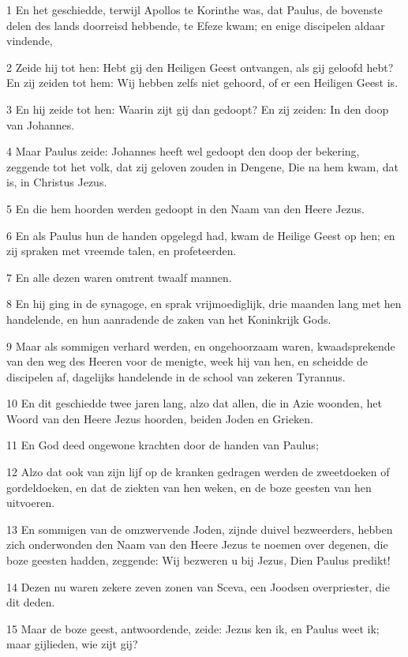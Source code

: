\par 1 En het geschiedde, terwijl Apollos te Korinthe was, dat Paulus, de bovenste delen des lands doorreisd hebbende, te Efeze kwam; en enige discipelen aldaar vindende,
\par 2 Zeide hij tot hen: Hebt gij den Heiligen Geest ontvangen, als gij geloofd hebt? En zij zeiden tot hem: Wij hebben zelfs niet gehoord, of er een Heiligen Geest is.
\par 3 En hij zeide tot hen: Waarin zijt gij dan gedoopt? En zij zeiden: In den doop van Johannes.
\par 4 Maar Paulus zeide: Johannes heeft wel gedoopt den doop der bekering, zeggende tot het volk, dat zij geloven zouden in Dengene, Die na hem kwam, dat is, in Christus Jezus.
\par 5 En die hem hoorden werden gedoopt in den Naam van den Heere Jezus.
\par 6 En als Paulus hun de handen opgelegd had, kwam de Heilige Geest op hen; en zij spraken met vreemde talen, en profeteerden.
\par 7 En alle dezen waren omtrent twaalf mannen.
\par 8 En hij ging in de synagoge, en sprak vrijmoediglijk, drie maanden lang met hen handelende, en hun aanradende de zaken van het Koninkrijk Gods.
\par 9 Maar als sommigen verhard werden, en ongehoorzaam waren, kwaadsprekende van den weg des Heeren voor de menigte, week hij van hen, en scheidde de discipelen af, dagelijks handelende in de school van zekeren Tyrannus.
\par 10 En dit geschiedde twee jaren lang, alzo dat allen, die in Azie woonden, het Woord van den Heere Jezus hoorden, beiden Joden en Grieken.
\par 11 En God deed ongewone krachten door de handen van Paulus;
\par 12 Alzo dat ook van zijn lijf op de kranken gedragen werden de zweetdoeken of gordeldoeken, en dat de ziekten van hen weken, en de boze geesten van hen uitvoeren.
\par 13 En sommigen van de omzwervende Joden, zijnde duivel bezweerders, hebben zich onderwonden den Naam van den Heere Jezus te noemen over degenen, die boze geesten hadden, zeggende: Wij bezweren u bij Jezus, Dien Paulus predikt!
\par 14 Dezen nu waren zekere zeven zonen van Sceva, een Joodsen overpriester, die dit deden.
\par 15 Maar de boze geest, antwoordende, zeide: Jezus ken ik, en Paulus weet ik; maar gijlieden, wie zijt gij?
